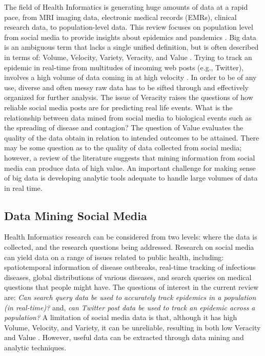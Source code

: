 \documentclass[sigconf]{acmart}
\begin{document}
The field of Health Informatics is generating huge amounts of data at a rapid pace,
from MRI imaging data, electronic medical records (EMRs), clinical research data, to
population-level data. This review focuses on population level from social media to 
provide insights about epidemics and pandemics \cite{hay13, herland14}. Big data is 
an ambiguous term that lacks a single unified definition, but is often described in 
terms of: Volume, Velocity, Variety, Veracity, and Value \cite{demchenko12}. Trying 
to track an epidemic in real-time from multitudes of incoming web posts (e.g., 
Twitter), involves a high volume of data coming in at high velocity \cite{lamb13, 
paul14}. In order to be of any use, diverse and often messy raw data has to be sifted
through and effectively organized for further analysis. The issue of Veracity raises 
the questions of how reliable social media posts are for predicting real life events.
What is the relationship between data mined from social media to biological events 
such as the spreading of disease and contagion? The question of Value evaluates the 
quality of the data obtain in relation to intended outcomes to be attained. There may
be some question as to the quality of data collected from social media; however, a
review of the literature suggests that mining information from social media can 
produce data of high value. An important challenge for making sense of big data 
is developing analytic tools adequate to handle large volumes of data in real time.

\subsection{Data Mining Social Media}

Health Informatics research can be considered from two levels: where the data 
is collected, and the research questions being addressed. Research on social 
media can yield data on a range of issues related to public health, including: 
spatiotemporal information of disease outbreaks, real-time tracking of infectious
diseases, global distributions of various diseases, and search queries on medical 
questions that people might have. The questions of interest in the current review 
are: \textit{Can search query data be used to accurately track epidemics in 
a population (in real-time)?}  and, \textit{can Twitter post data be used 
to track an epidemic across a population?} A limitation of social media data is 
that, although it has high Volume, Velocity, and Variety, it can be unreliable, 
resulting in both low Veracity and Value \cite{hay13, lazer14}. However, useful 
data can be extracted through data mining and analytic techniques. 
\end{document}
